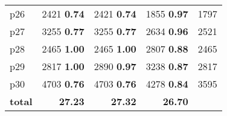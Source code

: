 \begin{tabular}{lrrrr}
\multicolumn{1}{l|}{p26} & {\footnotesize 2421} \textbf{0.74} & {\footnotesize 2421} \textbf{0.74} & {\footnotesize 1855} \textbf{0.97} & \multicolumn{1}{|r}{1797}\\
\multicolumn{1}{l|}{p27} & {\footnotesize 3255} \textbf{0.77} & {\footnotesize 3255} \textbf{0.77} & {\footnotesize 2634} \textbf{0.96} & \multicolumn{1}{|r}{2521}\\
\multicolumn{1}{l|}{p28} & {\footnotesize 2465} \textbf{1.00} & {\footnotesize 2465} \textbf{1.00} & {\footnotesize 2807} \textbf{0.88} & \multicolumn{1}{|r}{2465}\\
\multicolumn{1}{l|}{p29} & {\footnotesize 2817} \textbf{1.00} & {\footnotesize 2890} \textbf{0.97} & {\footnotesize 3238} \textbf{0.87} & \multicolumn{1}{|r}{2817}\\
\multicolumn{1}{l|}{p30} & {\footnotesize 4703} \textbf{0.76} & {\footnotesize 4703} \textbf{0.76} & {\footnotesize 4278} \textbf{0.84} & \multicolumn{1}{|r}{3595}\\
\midrule
\textbf{total} & \textbf{27.23} & \textbf{27.32} & \textbf{26.70} & \\
\bottomrule
\end{tabular}

